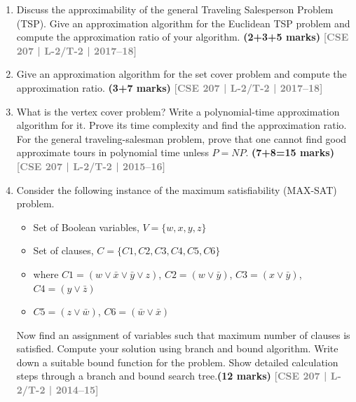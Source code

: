 \documentclass[12pt,a3paper]{article}
\newcommand{\yr}[1]{\hfill\textcolor{gray}{\small\textbf{[#1]}}}
\newcommand{\mk}[1]{\textcolor{orange!70!black}{\small\textbf{(#1 marks)}}}
\begin{document}
\begin{enumerate}
\begin{center}
\end{center}
\mk{12} \yr{CSE 207 | L-2/T-2 | 2019--20}


\item Discuss the approximability of the general Traveling Salesperson Problem (TSP). Give an approximation algorithm for the Euclidean TSP problem and compute the approximation ratio of your algorithm. \mk{2+3+5}
\yr{CSE 207 | L-2/T-2 | 2017--18}



\item Give an approximation algorithm for the set cover problem and compute the approximation ratio. \mk{3+7}
\yr{CSE 207 | L-2/T-2 | 2017--18}


\item What is the vertex cover problem? Write a polynomial-time approximation algorithm for it. Prove its time complexity and find the approximation ratio. For the general traveling-salesman problem, prove that one cannot find good approximate tours in polynomial time unless $P = NP$. \mk{7+8=15}
\yr{CSE 207 | L-2/T-2 | 2015--16}

\item Consider the following instance of the maximum satisfiability (MAX-SAT) problem.

\begin{itemize}
    \item[] Set of Boolean variables, $V = \{w, x, y, z\}$
    \item[] Set of clauses, $C = \{C1, C2, C3, C4, C5, C6\}$
    \item[] where $C1 = (w \vee \bar{x} \vee \bar{y} \vee z)$, \quad
            $C2 = (w \vee \bar{y})$, \quad
            $C3 = (x \vee \bar{y})$, \quad
            $C4 = (y \vee \bar{z})$
    \item[] $C5 = (z \vee \bar{w})$, \quad
            $C6 = (\bar{w} \vee \bar{x})$
\end{itemize}

\noindent
Now find an assignment of variables such that maximum number of clauses is satisfied.
Compute your solution using branch and bound algorithm. Write down a suitable bound
function for the problem. Show detailed calculation steps through a branch and bound
search tree.\mk{12}
\yr{CSE 207 | L-2/T-2 | 2014--15}


\end{enumerate}
\end{document}
